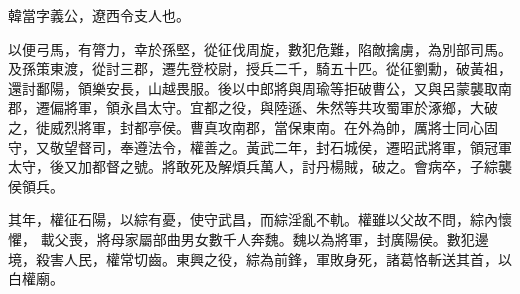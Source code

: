 \begin{pinyinscope}
 
 
 韓當字義公，遼西令支人也。
 
 
 以便弓馬，有膂力，幸於孫堅，從征伐周旋，數犯危難，陷敵擒虜，為別部司馬。
 及孫策東渡，從討三郡，遷先登校尉，授兵二千，騎五十匹。從征劉勳，破黃祖，還討鄱陽，領樂安長，山越畏服。後以中郎將與周瑜等拒破曹公，又與呂蒙襲取南郡，遷偏將軍，領永昌太守。宜都之役，與陸遜、朱然等共攻蜀軍於涿鄉，大破之，徙威烈將軍，封都亭侯。曹真攻南郡，當保東南。在外為帥，厲將士同心固守，又敬望督司，奉遵法令，權善之。黃武二年，封石城侯，遷昭武將軍，領冠軍太守，後又加都督之號。將敢死及解煩兵萬人，討丹楊賊，破之。會病卒，子綜襲侯領兵。
 
 
其年，權征石陽，以綜有憂，使守武昌，而綜淫亂不軌。權雖以父故不問，綜內懷懼，
 載父喪，將母家屬部曲男女數千人奔魏。魏以為將軍，封廣陽侯。數犯邊境，殺害人民，權常切齒。東興之役，綜為前鋒，軍敗身死，諸葛恪斬送其首，以白權廟。
 
 
\end{pinyinscope}